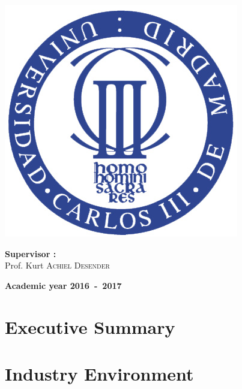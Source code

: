 \documentclass[12pt,a4paper,oneside]{book}
\begin{document}
\begin{titlepage}
\begin{center}
\includegraphics[keepaspectratio=true,width=\textwidth-2cm]{images/Seal_of_the_University_of_Carlos_III.jpg}
\vfill{}
\begin{flushleft}{\large \textbf{Supervisor  :}}\\
{\large Prof. Kurt \textsc{Achiel Desender}}
\end{flushleft}{\large\par}
\vfill{}\vfill{}\enlargethispage{2cm}
\textbf{Academic year 2016~-~2017}
\end{center}
\end{titlepage}



\newpage
\thispagestyle{empty} 
\null

\frontmatter

\tableofcontents

\mainmatter

\chapter{Executive Summary}

\chapter{Industry Environment}
\label{iechap}
\end{document}
